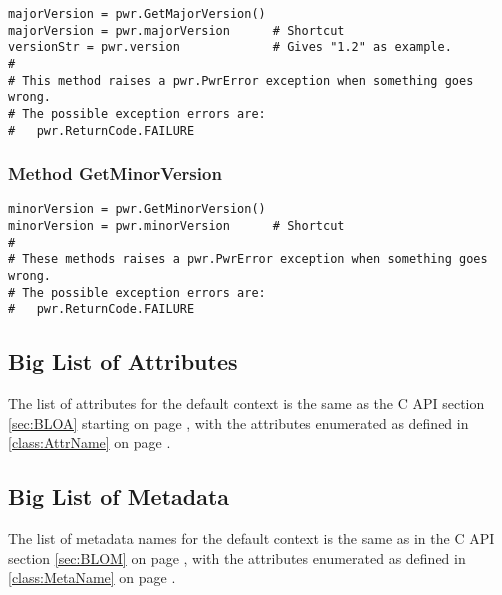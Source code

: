 \begin{center}\begin{minipage}{.95\linewidth}\begin{lstlisting}
majorVersion = pwr.GetMajorVersion()
majorVersion = pwr.majorVersion      # Shortcut
versionStr = pwr.version             # Gives "1.2" as example.
#
# This method raises a pwr.PwrError exception when something goes wrong.
# The possible exception errors are:
#   pwr.ReturnCode.FAILURE
\end{lstlisting}\end{minipage}\end{center}

\subsubsection{Method GetMinorVersion} \label{meth:GetMinorVersion}

\begin{center}\begin{minipage}{.95\linewidth}\begin{lstlisting}
minorVersion = pwr.GetMinorVersion()
minorVersion = pwr.minorVersion      # Shortcut
#
# These methods raises a pwr.PwrError exception when something goes wrong.
# The possible exception errors are:
#   pwr.ReturnCode.FAILURE
\end{lstlisting}\end{minipage}\end{center}

\subsection{Big List of Attributes} \label{sec:PythonBigListOfAttributes}

The list of attributes for the default context is the same as the C API section
\ref{sec:BLOA} starting on page \pageref{sec:BLOA}, with the attributes
enumerated as defined in \ref{class:AttrName} on page \pageref{class:AttrName}.

\subsection{Big List of Metadata} \label{sec:PythonBigListOfMetadata}

The list of metadata names for the default context is the same as in the C API
section \ref{sec:BLOM} on page \pageref{sec:BLOM}, with the attributes
enumerated as defined in \ref{class:MetaName} on page \pageref{class:MetaName}.
